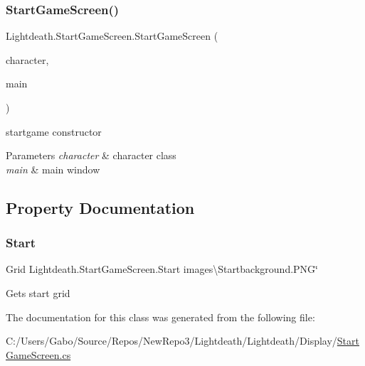 \subsubsection{\texorpdfstring{Start\+Game\+Screen()}{StartGameScreen()}}
{\footnotesize\ttfamily Lightdeath.\+Start\+Game\+Screen.\+Start\+Game\+Screen (\begin{DoxyParamCaption}\item[{\hyperlink{class_lightdeath_1_1_character__classes}{Character\+\_\+classes}}]{character,  }\item[{\hyperlink{class_lightdeath_1_1_main_window}{Main\+Window}}]{main }\end{DoxyParamCaption})\hspace{0.3cm}{\ttfamily [inline]}}



startgame constructor 


\begin{DoxyParams}{Parameters}
{\em character} & character class\\
\hline
{\em main} & main window\\
\hline
\end{DoxyParams}


\subsection{Property Documentation}
\hypertarget{class_lightdeath_1_1_start_game_screen_ac78dec5ea7adc39f8e74fe832f0205e0}{}\label{class_lightdeath_1_1_start_game_screen_ac78dec5ea7adc39f8e74fe832f0205e0} 
\subsubsection{\texorpdfstring{Start}{Start}}
{\footnotesize\ttfamily Grid Lightdeath.\+Start\+Game\+Screen.\+Start images\textbackslash{}\+Startbackground.\+P\+NG\char`\"{}\hspace{0.3cm}{\ttfamily [get]}}



Gets start grid 



The documentation for this class was generated from the following file\+:\begin{DoxyCompactItemize}
\item 
C\+:/\+Users/\+Gabo/\+Source/\+Repos/\+New\+Repo3/\+Lightdeath/\+Lightdeath/\+Display/\hyperlink{_start_game_screen_8cs}{Start\+Game\+Screen.\+cs}\end{DoxyCompactItemize}

